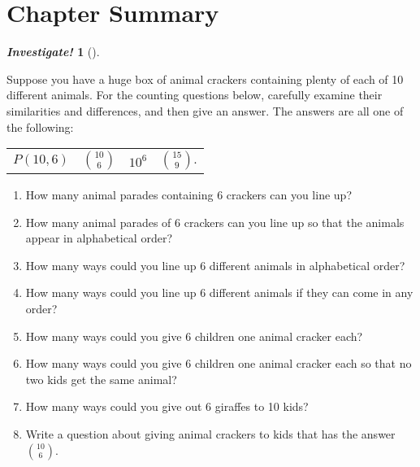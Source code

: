 \documentclass[10pt,]{book}
\theoremstyle{plain}
\theoremstyle{definition}
\theoremstyle{definition}
\newtheorem{investigation}[project]{\emph{Investigate!}}
\theoremstyle{definition}
\numberwithin{equation}{section}
\begin{document}
\section[Chapter Summary]{Chapter Summary}\label{sec_count-conc}
\begin{investigation}[]\label{investigation-14}

        Suppose you have a huge box of animal crackers containing plenty of each of 10 different animals. For the counting questions below, carefully examine their similarities and differences, and then give an answer. The answers are all one of the following:
        \leavevmode%
\begin{table}
\centering
\begin{tabular}{llll}
\(P(10,6)\)&\({10 \choose 6}\)&\(10^6\)&\({15 \choose 9}.\)
\end{tabular}
\end{table}

        \leavevmode%
\begin{enumerate}
\item\hypertarget{li-645}{}
              How many animal parades containing 6 crackers can you line up?
\item\hypertarget{li-646}{}
              How many animal parades of 6 crackers can you line up so that the animals appear in alphabetical order?
\item\hypertarget{li-647}{}
              How many ways could you line up 6 different animals in alphabetical order?
\item\hypertarget{li-648}{}
              How many ways could you line up 6 different animals if they can come in any order?
\item\hypertarget{li-649}{}
              How many ways could you give 6 children one animal cracker each?
\item\hypertarget{li-650}{}
              How many ways could you give 6 children one animal cracker each so that no two kids get the same animal?
\item\hypertarget{li-651}{}
              How many ways could you give out 6 giraffes to 10 kids?
\item\hypertarget{li-652}{}
              Write a question about giving animal crackers to kids that has the answer \({10\choose 6}\).
\end{enumerate}

\end{investigation}
\end{document}
